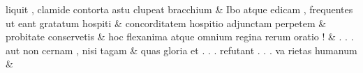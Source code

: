 \documentclass[12pt,onecolumn,twoside,a4paper]{memoir}
\begin{document}
\begin{pairs}
\begin{Leftside}
      liquit
      ,
      clamide
      contorta
      astu
      clupeat
      bracchium \&
                         \stanza {}
                      Ibo
      atque
      edicam
      ,
      frequentes
      ut
      eant
      gratatum
      hospiti \&
                         \stanza {}concorditatem
      hospitio
      adjunctam
      perpetem & 
                     probitate
      conservetis \&
                         \stanza {}
                       hoc
      flexanima
      atque
      omnium
      regina
      rerum
      oratio
      ! \&
                         \stanza {}
                     .
      .
      .
      aut
      non
      cernam
      ,
      nisi
      tagam \&
                         \stanza {}
                      quas
      gloria
      et
      {
      .
      .
      .
      refutant
      .
      .
      .
      va
      }
      rietas
      humanum \&
                     
                  \endnumbering
		\end{Leftside}
                  \begin{Rightside}
			\beginnumbering
			\numberstanzafalse
                     

\end{Rightside}
\end{pairs}
\end{document}
